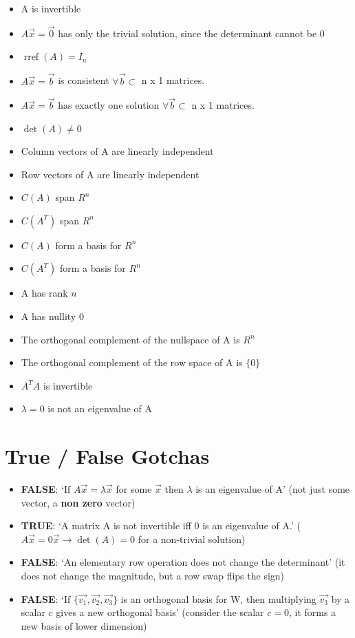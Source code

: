 \documentclass[10pt,landscape,a4paper]{article}
\DeclareMathOperator{\rref}{rref}
\begin{document}
\begin{multicols*}{3}
  \begin{itemize}
    \item A is invertible
    \item $A\vec{x} = \vec{0}$ has only the trivial solution, since the
      determinant cannot be 0
    \item $\rref (A) = I_n$
    \item $A\vec{x} = \vec{b}$ is consistent $\forall \vec{b} \subset$ n x 1 matrices.
    \item $A\vec{x} = \vec{b}$ has exactly one solution $\forall \vec{b} \subset$ n x 1 matrices.
    \item $\det(A) \neq 0$
    \item Column vectors of A are linearly independent
    \item Row vectors of A are linearly independent
    \item $C(A)$ span $R^n$
    \item $C(A^T)$ span $R^n$
    \item $C(A)$ form a basis for $R^n$
    \item $C(A^T)$ form a basis for $R^n$
    \item A has rank $n$
    \item A has nullity 0
    \item The orthogonal complement of the nullspace of A is $R^n$
    \item The orthogonal complement of the row space of A is $\{ 0 \}$
    \item $A^T A$ is invertible
    \item $\lambda = 0$ is not an eigenvalue of A
  \end{itemize}

 \section{True / False Gotchas}
 \begin{itemize}
   \item \textbf{FALSE}: `If $A\vec{x} = \lambda \vec{x}$ for some $\vec{x}$ then $\lambda$ is an
    eigenvalue of A' (not just some vector, a \textbf{non zero} vector)
  \item \textbf{TRUE}: `A matrix A is not invertible iff 0 is an eigenvalue of
    A.' ($A\vec{x} = 0\vec{x} \to \det(A) = 0$ for a non-trivial solution)
  \item \textbf{FALSE}: `An elementary row operation does not change the
    determinant' (it does not change the magnitude, but a row swap flips the
    sign)
  \item \textbf{FALSE}: `If $\{ \vec{v_1}, \vec{v_2}, \vec{v_3} \}$ is an
    orthogonal basis for W, then multiplying $\vec{v_3}$ by a scalar $c$ gives a
    new orthogonal basis' (consider the scalar $c=0$, it forms a new basis of
    lower dimension)
 \end{itemize}

\end{multicols*}
\end{document}
